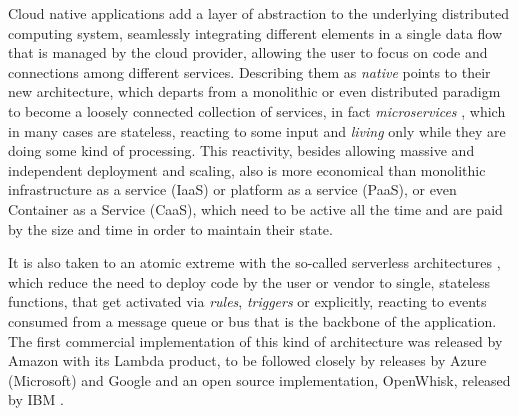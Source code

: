 \documentclass[sigconf]{acmart}
\begin{document}
  Cloud native applications add a layer of abstraction to the
  underlying distributed computing system, seamlessly integrating
  different elements in a single data flow that is managed by the
  cloud provider, allowing the user to focus on code and connections
  among different services. Describing them as {\em native} points
  to their new architecture, which departs from a monolithic or even
  distributed paradigm to become a loosely connected collection of
  services, in fact {\em microservices} \cite{microservices}, which in many cases are stateless, reacting to some input and
  {\em living} only while they are doing some kind of processing. This
  reactivity, besides allowing massive and independent deployment and
  scaling, also is more economical than monolithic infrastructure as
  a service (IaaS) or platform as a service (PaaS), or even Container
  as a Service (CaaS), which need to be active all the time and are
  paid by the size and time in order to maintain their state.

  It is also taken to an atomic extreme
  with the so-called serverless architectures \cite{Varghese2018849},
  which reduce the need to deploy code by the user or vendor to single, stateless
  functions, that get activated via {\em rules}, {\em triggers} or
  explicitly, reacting to events consumed from
  a message queue or bus that
  is the backbone of the application. The first commercial
  implementation of this kind of architecture was released by Amazon
  with its Lambda product, to be followed closely by releases by Azure
  (Microsoft) and Google and an open source implementation, OpenWhisk,
  released by IBM \cite{Baldini2016287}.
\end{document}
